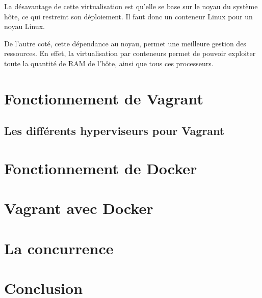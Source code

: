 \documentclass[12pt,a4paper]{article}
\begin{document}
La désavantage de cette virtualisation est qu'elle se base sur le noyau du système hôte, ce qui restreint son déploiement. Il faut donc un conteneur Linux pour un noyau Linux. 

De l'autre coté, cette dépendance au noyau, permet une meilleure gestion des ressources. En effet, la virtualisation par conteneurs permet de pouvoir exploiter toute la quantité de RAM de l'hôte, ainsi que tous ces processeurs.

\section{Fonctionnement de Vagrant}
\subsection{Les différents hyperviseurs pour Vagrant}

\section{Fonctionnement de Docker}

\section{Vagrant avec Docker}

\section{La concurrence}

\section{Conclusion}
\end{document}
